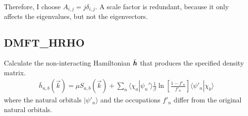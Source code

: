 \documentclass[11pt,a4paper]{report}
\begin{document}
Therefore, I choose $A_{i,j}=j\delta_{i,j}$. A scale factor is
redundant, because it only affects the eigenvalues, but not the
eigenvectors.


\subsection{DMFT\_HRHO}
\label{sec:routinedmfthrho}
Calculate the non-interacting Hamiltonian $\bar{\bm{h}}$ that
produces the specified density matrix.
\begin{eqnarray}
\bar{h}_{a,b}(\vec{k})=\mu S_{a,b}(\vec{k})+\sum_n\langle\chi_a|\psi_n'\rangle
\frac{1}{\beta}\ln\left[\frac{1-f'_n}{f'_n}\right]
\langle\psi'_n|\chi_b\rangle
\end{eqnarray}
where the natural orbitals $|\psi'_n\rangle$ and the occupations
$f'_n$ differ from the original natural orbitals.
\end{document}
